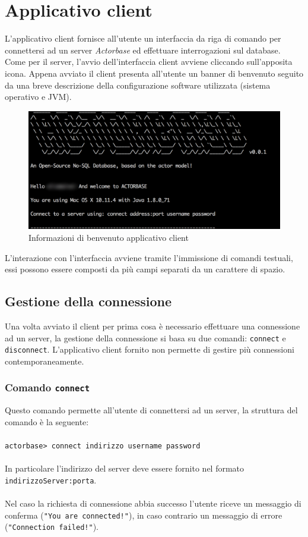 \documentclass[a4paper]{article}
\begin{document}
	\section{Applicativo client}
	L'applicativo client fornisce all'utente un interfaccia da riga di comando per connettersi ad un server \emph{Actorbase} ed effettuare interrogazioni sul database. Come per il server, l'avvio dell'interfaccia client avviene cliccando sull'apposita icona. Appena avviato il client presenta all'utente un banner di benvenuto seguito da una breve descrizione della configurazione software utilizzata (sistema operativo e JVM).
	\begin{figure}[H]
		\centering
		\includegraphics[width=\textwidth]{welcomeClient.png}
		\caption{Informazioni di benvenuto applicativo client}
	\end{figure}
	L'interazione con l'interfaccia avviene tramite l'immissione di comandi testuali, essi possono essere composti da più campi separati da un carattere di spazio.
	
	\subsection{Gestione della connessione}
	Una volta avviato il client per prima cosa è necessario effettuare una connessione ad un server, la gestione della connessione si basa su due comandi: \texttt{connect} e \texttt{disconnect}. L'applicativo client fornito non permette di gestire più connessioni contemporaneamente.
	
	\subsubsection{Comando \texttt{connect}}
	Questo comando permette all'utente di connettersi ad un server, la struttura del comando è la seguente:
	\\ \\
	\texttt{actorbase>	connect indirizzo username password}
	\\ \\
	In particolare l'indirizzo del server deve essere fornito nel formato \texttt{indirizzoServer:porta}. \\ \\
	Nel caso la richiesta di connessione abbia successo l'utente riceve un messaggio di conferma (\texttt{"You are connected!"}), in caso contrario un messaggio di errore (\texttt{"Connection failed!"}).
	
\end{document}
